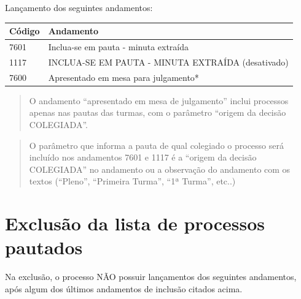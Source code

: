 \documentclass[
]{book}
\begin{document}
Lançamento dos seguintes andamentos:

\begin{table}[H]
\centering\begingroup\fontsize{14}{16}\selectfont

\begin{tabular}{l|l}
\hline
Código & Andamento\\
\hline
7601 & Inclua-se em pauta - minuta extraída\\
\hline
1117 & INCLUA-SE EM PAUTA - MINUTA EXTRAÍDA (desativado)\\
\hline
7600 & Apresentado em mesa para julgamento*\\
\hline
\end{tabular}
\endgroup{}
\end{table}

\begin{quote}
O andamento ``apresentado em mesa de julgamento'' inclui processos apenas nas pautas das turmas, com o parâmetro ``origem da decisão COLEGIADA''.
\end{quote}

\begin{quote}
O parâmetro que informa a pauta de qual colegiado o processo será incluído nos andamentos 7601 e 1117 é a ``origem da decisão COLEGIADA'' no andamento ou a observação do andamento com os textos (``Pleno'', ``Primeira Turma'', ``1ª Turma'', etc..)
\end{quote}

\hypertarget{exclusuxe3o-da-lista-de-processos-pautados}{%
\section{Exclusão da lista de processos pautados}\label{exclusuxe3o-da-lista-de-processos-pautados}}

Na exclusão, o processo NÃO possuir lançamentos dos seguintes andamentos, após algum dos últimos andamentos de inclusão citados acima.
\end{document}
